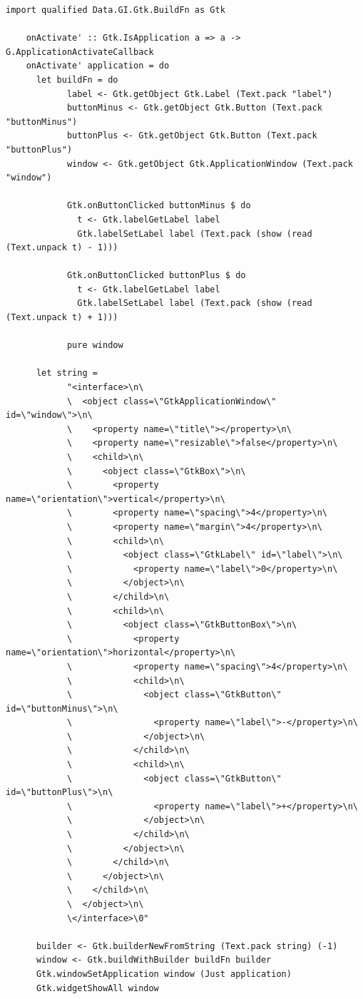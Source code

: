 \documentclass[UdineBachThesis,american,11pt]{PhdThesis}
\begin{document}
  \begin{lstlisting}[gobble=4,basicstyle=\ttfamily\small]
    import qualified Data.GI.Gtk.BuildFn as Gtk

    onActivate' :: Gtk.IsApplication a => a -> G.ApplicationActivateCallback
    onActivate' application = do
      let buildFn = do
            label <- Gtk.getObject Gtk.Label (Text.pack "label")
            buttonMinus <- Gtk.getObject Gtk.Button (Text.pack "buttonMinus")
            buttonPlus <- Gtk.getObject Gtk.Button (Text.pack "buttonPlus")
            window <- Gtk.getObject Gtk.ApplicationWindow (Text.pack "window")

            Gtk.onButtonClicked buttonMinus $ do
              t <- Gtk.labelGetLabel label
              Gtk.labelSetLabel label (Text.pack (show (read (Text.unpack t) - 1)))

            Gtk.onButtonClicked buttonPlus $ do
              t <- Gtk.labelGetLabel label
              Gtk.labelSetLabel label (Text.pack (show (read (Text.unpack t) + 1)))

            pure window

      let string =
            "<interface>\n\
            \  <object class=\"GtkApplicationWindow\" id=\"window\">\n\
            \    <property name=\"title\"></property>\n\
            \    <property name=\"resizable\">false</property>\n\
            \    <child>\n\
            \      <object class=\"GtkBox\">\n\
            \        <property name=\"orientation\">vertical</property>\n\
            \        <property name=\"spacing\">4</property>\n\
            \        <property name=\"margin\">4</property>\n\
            \        <child>\n\
            \          <object class=\"GtkLabel\" id=\"label\">\n\
            \            <property name=\"label\">0</property>\n\
            \          </object>\n\
            \        </child>\n\
            \        <child>\n\
            \          <object class=\"GtkButtonBox\">\n\
            \            <property name=\"orientation\">horizontal</property>\n\
            \            <property name=\"spacing\">4</property>\n\
            \            <child>\n\
            \              <object class=\"GtkButton\" id=\"buttonMinus\">\n\
            \                <property name=\"label\">-</property>\n\
            \              </object>\n\
            \            </child>\n\
            \            <child>\n\
            \              <object class=\"GtkButton\" id=\"buttonPlus\">\n\
            \                <property name=\"label\">+</property>\n\
            \              </object>\n\
            \            </child>\n\
            \          </object>\n\
            \        </child>\n\
            \      </object>\n\
            \    </child>\n\
            \  </object>\n\
            \</interface>\0"

      builder <- Gtk.builderNewFromString (Text.pack string) (-1)
      window <- Gtk.buildWithBuilder buildFn builder
      Gtk.windowSetApplication window (Just application)
      Gtk.widgetShowAll window
  \end{lstlisting}
\end{document}
